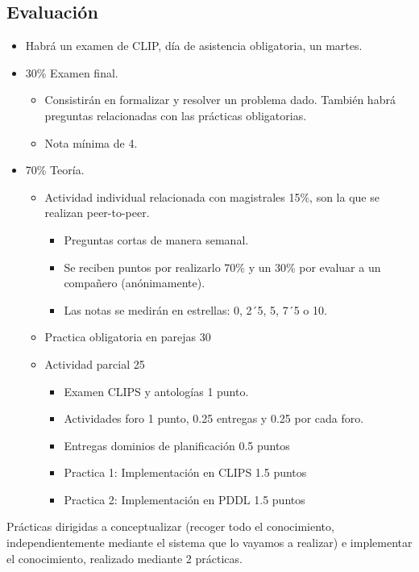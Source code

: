 \documentclass[12pt, twoside, openright]{report} %
\begin{document}
\subsection{Evaluación}
\begin{itemize}
  \item Habrá un examen de CLIP, día de asistencia obligatoria, un martes.
  \item 30\% Examen final.
  \begin{itemize}
    \item Consistirán en formalizar y resolver un problema dado. También habrá preguntas relacionadas con las prácticas obligatorias.
    \item Nota mínima de 4. 
  \end{itemize}
  \item 70\% Teoría.
  \begin{itemize}
    \item Actividad individual relacionada con magistrales 15\%, son la que se realizan peer-to-peer.
    \begin{itemize}
      \item Preguntas cortas de manera semanal.
      \item Se reciben puntos por realizarlo 70\% y un 30\% por evaluar a un compañero (anónimamente).
      \item Las notas se medirán en estrellas: 0, 2´5, 5, 7´5 o 10. 
    \end{itemize}
    \item Practica obligatoria en parejas 30%
    \item Actividad parcial 25%
    \begin{itemize}
      \item Examen CLIPS y antologías 1 punto.
      \item Actividades foro 1 punto, 0.25 entregas  y 0.25 por cada foro.
      \item Entregas dominios de planificación 0.5 puntos
      \item Practica 1: Implementación en CLIPS 1.5 puntos
      \item Practica 2: Implementación en PDDL 1.5 puntos 
    \end{itemize}
  \end{itemize} 
\end{itemize}

Prácticas dirigidas a conceptualizar (recoger todo el conocimiento, independientemente mediante el sistema que lo vayamos a realizar) e implementar el conocimiento, realizado mediante 2 prácticas.
\end{document}
